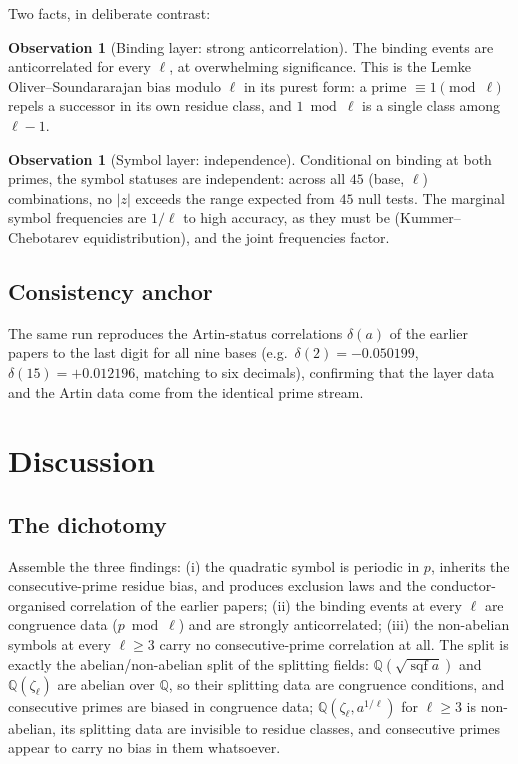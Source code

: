 \documentclass[11pt,reqno]{amsart}
\theoremstyle{plain}
\theoremstyle{definition}
\newtheorem{observation}[theorem]{Observation}
\DeclareMathOperator{\sqf}{sqf}
\newcommand{\Q}{\mathbb{Q}}
\begin{document}
Two facts, in deliberate contrast:

\begin{observation}[Binding layer: strong anticorrelation]
\label{obs:bind}
The binding events are anticorrelated for every $\ell$, at overwhelming
significance. This is the Lemke Oliver--Soundararajan bias modulo $\ell$ in
its purest form: a prime $\equiv 1 \pmod \ell$ repels a successor in its own
residue class, and $1 \bmod \ell$ is a single class among $\ell - 1$.
\end{observation}

\begin{observation}[Symbol layer: independence]
\label{obs:sym}
Conditional on binding at both primes, the symbol statuses are independent:
across all $45$ (base, $\ell$) combinations, no $|z|$ exceeds the range
expected from $45$ null tests. The marginal symbol frequencies are
$1/\ell$ to high accuracy, as they must be (Kummer--Chebotarev
equidistribution), and the joint frequencies factor.
\end{observation}

\subsection{Consistency anchor}
The same run reproduces the Artin-status correlations $\delta(a)$ of the
earlier papers to the last digit for all nine bases
(e.g.\ $\delta(2) = -0.050199$, $\delta(15) = +0.012196$, matching to six decimals), confirming that the layer data and the Artin data come from
the identical prime stream.

\section{Discussion}
\label{sec:discussion}

\subsection*{The dichotomy}
Assemble the three findings: (i) the quadratic symbol is periodic in $p$,
inherits the consecutive-prime residue bias, and produces exclusion laws and
the conductor-organised correlation of the earlier papers; (ii) the binding
events at every $\ell$ are congruence data ($p \bmod \ell$) and are strongly
anticorrelated; (iii) the non-abelian symbols at every $\ell \ge 3$ carry no
consecutive-prime correlation at all. The split is exactly the
abelian/non-abelian split of the splitting fields: $\Q(\sqrt{\sqf a})$ and
$\Q(\zeta_\ell)$ are abelian over $\Q$, so their splitting data are
congruence conditions, and consecutive primes are biased in congruence data;
$\Q(\zeta_\ell, a^{1/\ell})$ for $\ell \ge 3$ is non-abelian, its splitting
data are invisible to residue classes, and consecutive primes appear to
carry no bias in them whatsoever.
\end{document}
